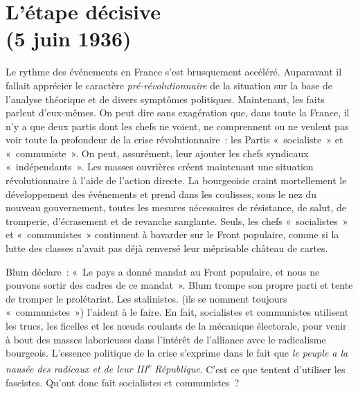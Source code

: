 \documentclass[french,twoside]{book} %
\newcommand\chapteropen{} %
\newcommand\chaptercont{} %
\begin{document}
\chapteropen
 \chapter[{L’étape décisive, (5 juin 1936)}]{L’étape décisive \\
(5 juin 1936)}
\label{p6}\renewcommand{\leftmark}{L’étape décisive \\
(5 juin 1936)}


\chaptercont
\noindent Le rythme des événements en France s’est brusquement accéléré. Auparavant il fallait apprécier le caractère \emph{pré-révolutionnaire} de la situation sur la base de l’analyse théorique et de divers symptômes politiques. Maintenant, les faits parlent d’eux-mêmes. On peut dire sans exagération que, dans toute la France, il n’y a que deux partis dont les chefs ne voient, ne comprennent ou ne veulent pas voir toute la profondeur de la crise révolutionnaire : les Partis « socialiste » et « communiste ». On peut, assurément, leur ajouter les chefs syndicaux « indépendants ». Les masses ouvrières créent maintenant une situation révolutionnaire à l’aide de l’action directe. La bourgeoisie craint mortellement le développement des événements et prend dans les coulisses, sous le nez du nouveau gouvernement, toutes les mesures nécessaires de résistance, de salut, de tromperie, d’écrasement et de revanche sanglante. Seuls, les chefs « socialistes » et « communistes » continuent à bavarder sur le Front populaire, comme si la lutte des classes n’avait pas déjà renversé leur méprisable château de cartes.\par
Blum déclare : « Le pays a donné mandat au Front populaire, et nous ne pouvons sortir des cadres de ce mandat ». Blum trompe son propre parti et tente de tromper le prolétariat. Les stalinistes. (ils se nomment toujours « communistes ») l’aident à le faire. En fait, socialistes et communistes utilisent les trucs, les ficelles et les nœuds  coulants de la mécanique électorale, pour venir à bout des masses laborieuses dans l’intérêt de l’alliance avec le radicalisme bourgeois. L’essence politique de la crise s’exprime dans le fait que \emph{le peuple a la nausée des radicaux et de leur III\textsuperscript{e} République}. C’est ce que tentent d’utiliser les fascistes. Qu’ont donc fait socialistes et communistes ?\par
\end{document}
